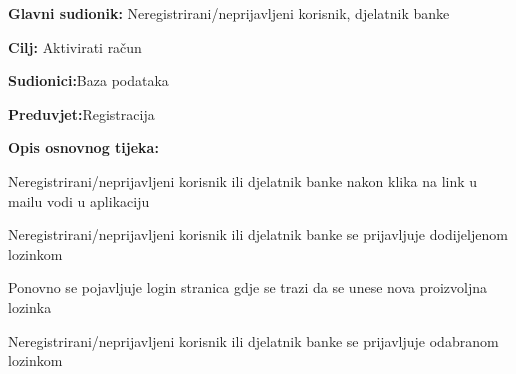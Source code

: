 \noindent {}
\begin{packed_item}
	
	\item \textbf{Glavni sudionik: } {Neregistrirani/neprijavljeni korisnik, djelatnik banke}
	\item  \textbf{Cilj:} {Aktivirati račun}
	\item  \textbf{Sudionici:}{Baza podataka} 
	\item  \textbf{Preduvjet:}{Registracija}
	\item  \textbf{Opis osnovnog tijeka:}
	
	\item[] \begin{packed_enum}
		
		\item {Neregistrirani/neprijavljeni korisnik ili  djelatnik banke nakon klika na link u mailu vodi u aplikaciju}
		\item {Neregistrirani/neprijavljeni korisnik ili  djelatnik banke se prijavljuje dodijeljenom lozinkom}
		\item {Ponovno se pojavljuje login stranica gdje se trazi da se unese nova proizvoljna lozinka} 
		\item {Neregistrirani/neprijavljeni korisnik ili  djelatnik banke se prijavljuje odabranom lozinkom}
	\end{packed_enum}
	
\end{packed_item}
\eject
\noindent {}
